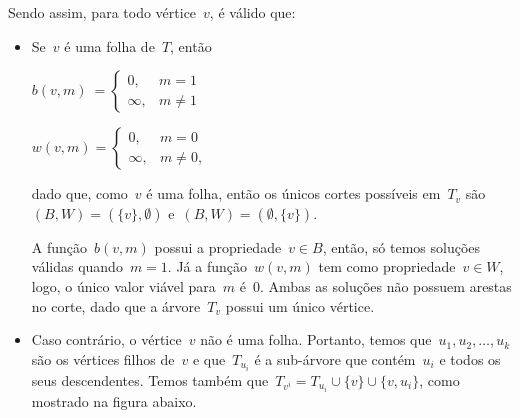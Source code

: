 Sendo assim, para todo vértice~$v$, é válido que:
\begin{itemize}
	\item Se~$v$ é uma folha de~$T$, então
	
	\medskip

	$ b(v,m)~ = 
	\begin{cases}
		0, &m=1 \\
		\infty, &m\ne 1
	\end{cases}$

	\medskip

	$w(v,m) = 
	\begin{cases}
		0, &m=0 \\
		\infty, &m\ne 0,
	\end{cases}$

dado que, como~$v$ é uma folha,
então os únicos
cortes possíveis em~$T_v$ são~${(B,W) = (\{v\},\emptyset)}$ 
e~${(B,W) = (\emptyset, \{v\})}$.

A função~$b(v,m)$ possui a propriedade~${v\in B}$,
então, só temos soluções válidas quando~${m=1}$.
Já a função~$w(v,m)$ tem como propriedade~${v\in W}$,
logo, o único valor viável para~$m$ é~$0$.
Ambas as soluções não possuem arestas no corte, dado que
a árvore~$T_v$
possui um único vértice.

\item Caso contrário, o vértice~$v$ não é uma folha. 
Portanto, temos que~$u_1,u_2,\ldots,u_k$ são
os vértices filhos de~$v$ e 
que~$T_{u_i}$ é a sub-árvore que contém~$u_i$ e 
todos os seus descendentes.
Temos também que~${T_{v^i} = T_{u_i}\cup \{v\}\cup \{v,u_i\}} $,
como mostrado na figura abaixo.
	\begin{center} 
\end{center}
\end{itemize}

